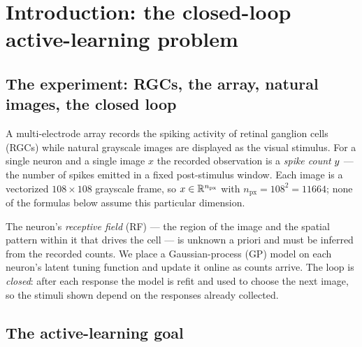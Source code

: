 
\section{Introduction: the closed-loop active-learning problem}
\label{sec:intro}

\subsection{The experiment: RGCs, the array, natural images, the closed loop}

A multi-electrode array records the spiking activity of retinal ganglion cells
(RGCs) while natural grayscale images are displayed as the visual stimulus. For a
single neuron and a single image $x$ the recorded observation is a \emph{spike
count} $y$ --- the number of spikes emitted in a fixed post-stimulus window.
Each image is a vectorized $108\times108$ grayscale frame, so
$x\in\mathbb{R}^{n_{\mathrm{px}}}$ with $n_{\mathrm{px}}=108^2=11664$; none of the
formulas below assume this particular dimension.

The neuron's \emph{receptive field} (RF) --- the region of the image and the
spatial pattern within it that drives the cell --- is unknown a priori and must be
inferred from the recorded counts. We place a Gaussian-process (GP) model on each
neuron's latent tuning function and update it online as counts arrive. The loop is
\emph{closed}: after each response the model is refit and used to choose the next
image, so the stimuli shown depend on the responses already collected.

\subsection{The active-learning goal}

